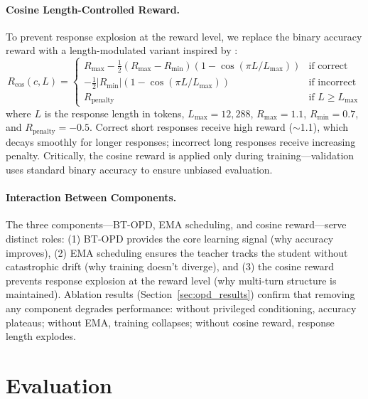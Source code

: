 \documentclass{article}
\begin{document}
\paragraph{Cosine Length-Controlled Reward.}
To prevent response explosion at the reward level, we replace the binary accuracy reward with a length-modulated variant inspired by \citet{yeo2025cosine}:
\begin{equation}
    R_{\text{cos}}(c, L) = \begin{cases}
        R_{\text{max}} - \frac{1}{2}(R_{\text{max}} - R_{\text{min}})(1 - \cos(\pi L / L_{\text{max}})) & \text{if correct} \\[4pt]
        -\frac{1}{2}|R_{\text{min}}|(1 - \cos(\pi L / L_{\text{max}})) & \text{if incorrect} \\[4pt]
        R_{\text{penalty}} & \text{if } L \geq L_{\text{max}}
    \end{cases}
\label{eq:cosine_reward}
\end{equation}
where $L$ is the response length in tokens, $L_{\text{max}} = 12{,}288$, $R_{\text{max}} = 1.1$, $R_{\text{min}} = 0.7$, and $R_{\text{penalty}} = -0.5$. Correct short responses receive high reward ($\sim$1.1), which decays smoothly for longer responses; incorrect long responses receive increasing penalty. Critically, the cosine reward is applied only during training---validation uses standard binary accuracy to ensure unbiased evaluation.

\paragraph{Interaction Between Components.}
The three components---BT-OPD, EMA scheduling, and cosine reward---serve distinct roles: (1) BT-OPD provides the core learning signal (why accuracy improves), (2) EMA scheduling ensures the teacher tracks the student without catastrophic drift (why training doesn't diverge), and (3) the cosine reward prevents response explosion at the reward level (why multi-turn structure is maintained). Ablation results (Section~\ref{sec:opd_results}) confirm that removing any component degrades performance: without privileged conditioning, accuracy plateaus; without EMA, training collapses; without cosine reward, response length explodes.


\section{Evaluation}
\label{sec:eval}
\end{document}

